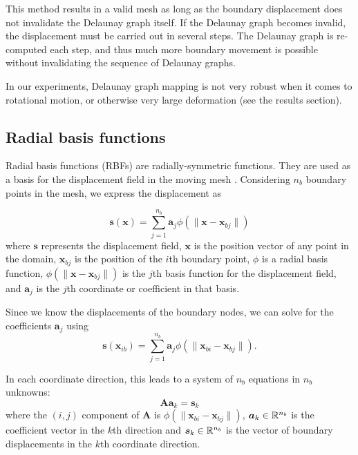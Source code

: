  This method results in a valid mesh as long as the boundary displacement does not invalidate the Delaunay graph itself. If the Delaunay graph becomes invalid, the displacement must be carried out in several steps. The Delaunay graph is re-computed each step, and thus much more boundary movement is possible without invalidating the sequence of Delaunay graphs.
 
 In our experiments, Delaunay graph mapping is not very robust when it comes to rotational motion, or otherwise very large deformation (see the results section).
 
 \subsection{Radial basis functions}
 
 Radial basis functions (RBFs) are radially-symmetric functions. They are used as a basis for the displacement field in the moving mesh \cite{mm:rbf}. Considering $n_b$ boundary points in the mesh, we express the displacement as
 
 \begin{equation}
 \mathbf{s}(\mathbf{x}) = \sum_{j=1}^{n_b} \mathbf{a}_j \phi(\lVert\mathbf{x} - \mathbf{x}_{bj}\rVert)
 \label{eqn:rbf}
 \end{equation}
 where $\mathbf{s}$ represents the displacement field, $\mathbf{x}$ is the position vector of any point in the domain, $\mathbf{x}_{bj}$ is the position of the $i$th boundary point, $\phi$ is a radial basis function, $\phi(\lVert\mathbf{x} - \mathbf{x}_{bj}\rVert)$ is the $j$th basis function for the displacement field, and $\mathbf{a}_j$ is the $j$th coordinate or coefficient in that basis.
 
 Since we know the displacements of the boundary nodes, we can solve for the coefficients $\mathbf{a}_j$ using
 \begin{equation}
 \mathbf{s}(\mathbf{x}_{ib}) = \sum_{j=1}^{n_b} \mathbf{a}_j \phi(\lVert\mathbf{x}_{bi} - \mathbf{x}_{bj}\rVert).
 \end{equation}
 
 In each coordinate direction, this leads to a system of $n_b$ equations in $n_b$ unknowns:
 \begin{equation}
 \mathbf{A}\mathbf{a}_k = \mathbf{s}_k
 \end{equation}
 where the $(i,j)$ component of $\mathbf{A}$ is $\phi(\lVert\mathbf{x}_{bi} - \mathbf{x}_{bj} \rVert)$, $ \boldsymbol{a}_k \in \mathbb{R}^{n_b}$ is the coefficient vector in the $k$th direction and $\boldsymbol{s}_k \in \mathbb{R}^{n_b}$ is the vector of boundary displacements in the $k$th coordinate direction.
 
